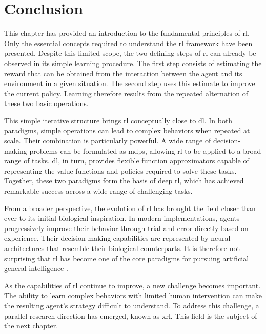 \section{Conclusion}
\label{sec:reinforcement_learning_conclusion}

This chapter has provided an introduction to the fundamental principles of \gls{rl}.
Only the essential concepts required to understand the \gls{rl} framework have been presented.
Despite this limited scope, the two defining steps of \gls{rl} can already be observed in its simple learning procedure.
The first step consists of estimating the reward that can be obtained from the interaction between the agent and its environment in a given situation.
The second step uses this estimate to improve the current policy.
Learning therefore results from the repeated alternation of these two basic operations.

This simple iterative structure brings \gls{rl} conceptually close to \gls{dl}.
In both paradigms, simple operations can lead to complex behaviors when repeated at scale.
Their combination is particularly powerful.
A wide range of decision-making problems can be formulated as \glspl{mdp}, allowing \gls{rl} to be applied to a broad range of tasks.
\gls{dl}, in turn, provides flexible function approximators capable of representing the value functions and policies required to solve these tasks.
Together, these two paradigms form the basis of deep \gls{rl}, which has achieved remarkable success across a wide range of challenging tasks.

From a broader perspective, the evolution of \gls{rl} has brought the field closer than ever to its initial biological inspiration.
In modern implementations, agents progressively improve their behavior through trial and error directly based on experience.
Their decision-making capabilities are represented by neural architectures that resemble their biological counterparts.
It is therefore not surprising that \gls{rl} has become one of the core paradigms for pursuing artificial general intelligence \parencite{silver2021reward}.

As the capabilities of \gls{rl} continue to improve, a new challenge becomes important.
The ability to learn complex behaviors with limited human intervention can make the resulting agent's strategy difficult to understand.
To address this challenge, a parallel research direction has emerged, known as \gls{xrl}.
This field is the subject of the next chapter.
